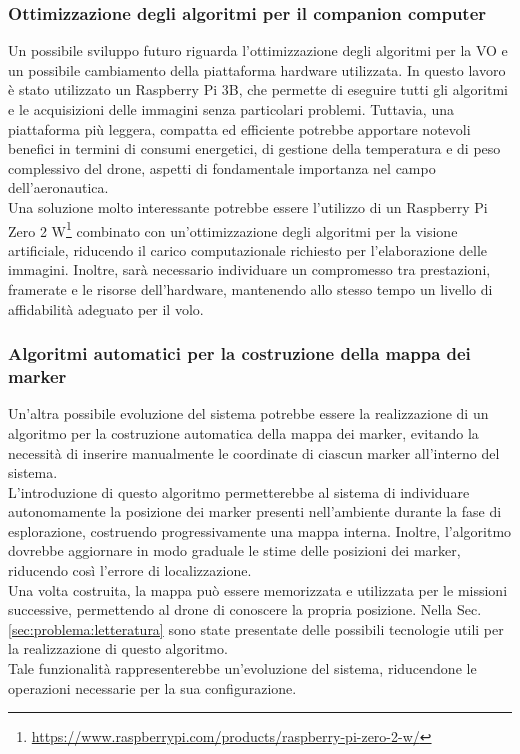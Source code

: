 \subsubsection{Ottimizzazione degli algoritmi per il companion computer}
Un possibile sviluppo futuro riguarda l'ottimizzazione degli algoritmi per la VO e un possibile cambiamento della piattaforma hardware utilizzata.  In questo lavoro è stato utilizzato un Raspberry Pi 3B, che permette di eseguire tutti gli algoritmi e le acquisizioni delle immagini senza particolari problemi. Tuttavia, una piattaforma più leggera, compatta ed efficiente potrebbe apportare notevoli benefici in termini di consumi energetici, di gestione della temperatura e di peso complessivo del drone, aspetti di fondamentale importanza nel campo dell'aeronautica. \\
Una soluzione molto interessante potrebbe essere l'utilizzo di un Raspberry Pi Zero 2 W\footnote{\url{https://www.raspberrypi.com/products/raspberry-pi-zero-2-w/}} combinato con un'ottimizzazione degli algoritmi per la visione artificiale, riducendo il carico computazionale richiesto per l'elaborazione delle immagini. Inoltre, sarà necessario individuare un compromesso tra prestazioni, framerate e le risorse dell'hardware, mantenendo allo stesso tempo un livello di affidabilità adeguato per il volo.

\subsubsection{Algoritmi automatici per la costruzione della mappa dei marker}
Un'altra possibile evoluzione del sistema potrebbe essere la realizzazione di un algoritmo per la costruzione automatica della mappa dei marker, evitando la necessità di inserire manualmente le coordinate di ciascun marker all'interno del sistema. \\
L'introduzione di questo algoritmo permetterebbe al sistema di individuare autonomamente la posizione dei marker presenti nell'ambiente durante la fase di esplorazione, costruendo progressivamente una mappa interna. Inoltre, l'algoritmo dovrebbe aggiornare in modo graduale le stime delle posizioni dei marker, riducendo così l'errore di localizzazione.\\
Una volta costruita, la mappa può essere memorizzata e utilizzata per le missioni successive, permettendo al drone di conoscere la propria posizione. Nella Sec. \ref{sec:problema:letteratura} sono state presentate delle possibili tecnologie utili per la realizzazione di questo algoritmo. \\
Tale funzionalità rappresenterebbe un'evoluzione del sistema, riducendone le operazioni necessarie per la sua configurazione. 